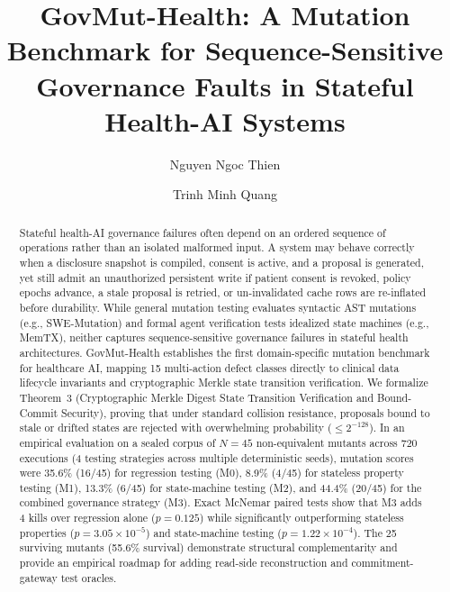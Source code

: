 \documentclass[runningheads]{llncs}
\begin{document}
\title{GovMut-Health: A Mutation Benchmark for Sequence-Sensitive Governance Faults in Stateful Health-AI Systems}
\author{Nguyen Ngoc Thien \and Trinh Minh Quang}
\maketitle
\thispagestyle{empty}\pagestyle{empty}

\begin{abstract}
Stateful health-AI governance failures often depend on an ordered sequence of operations rather than an isolated malformed input. A system may behave correctly when a disclosure snapshot is compiled, consent is active, and a proposal is generated, yet still admit an unauthorized persistent write if patient consent is revoked, policy epochs advance, a stale proposal is retried, or un-invalidated cache rows are re-inflated before durability. While general mutation testing evaluates syntactic AST mutations (e.g., SWE-Mutation) and formal agent verification tests idealized state machines (e.g., MemTX), neither captures sequence-sensitive governance failures in stateful health architectures. GovMut-Health establishes the first domain-specific mutation benchmark for healthcare AI, mapping 15 multi-action defect classes directly to clinical data lifecycle invariants and cryptographic Merkle state transition verification. We formalize Theorem~3 (Cryptographic Merkle Digest State Transition Verification and Bound-Commit Security), proving that under standard collision resistance, proposals bound to stale or drifted states are rejected with overwhelming probability ($\le 2^{-128}$). In an empirical evaluation on a sealed corpus of $N = 45$ non-equivalent mutants across 720 executions (4 testing strategies across multiple deterministic seeds), mutation scores were 35.6\% (16/45) for regression testing (M0), 8.9\% (4/45) for stateless property testing (M1), 13.3\% (6/45) for state-machine testing (M2), and 44.4\% (20/45) for the combined governance strategy (M3). Exact McNemar paired tests show that M3 adds 4 kills over regression alone ($p = 0.125$) while significantly outperforming stateless properties ($p = 3.05 \times 10^{-5}$) and state-machine testing ($p = 1.22 \times 10^{-4}$). The 25 surviving mutants (55.6\% survival) demonstrate structural complementarity and provide an empirical roadmap for adding read-side reconstruction and commitment-gateway test oracles.
\end{abstract}
\end{document}
